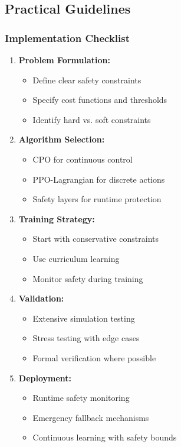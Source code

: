 \documentclass[12pt]{article}
\begin{document}
{{{{\subsection{Practical Guidelines}

\subsubsection{Implementation Checklist}

\begin{enumerate}
\item \textbf{Problem Formulation:}
   \begin{itemize}
   \item Define clear safety constraints
   \item Specify cost functions and thresholds
   \item Identify hard vs. soft constraints
   \end{itemize}

\item \textbf{Algorithm Selection:}
   \begin{itemize}
   \item CPO for continuous control
   \item PPO-Lagrangian for discrete actions
   \item Safety layers for runtime protection
   \end{itemize}

\item \textbf{Training Strategy:}
   \begin{itemize}
   \item Start with conservative constraints
   \item Use curriculum learning
   \item Monitor safety during training
   \end{itemize}

\item \textbf{Validation:}
   \begin{itemize}
   \item Extensive simulation testing
   \item Stress testing with edge cases
   \item Formal verification where possible
   \end{itemize}

\item \textbf{Deployment:}
   \begin{itemize}
   \item Runtime safety monitoring
   \item Emergency fallback mechanisms
   \item Continuous learning with safety bounds
   \end{itemize}
\end{enumerate}

}}}}
\end{document}
